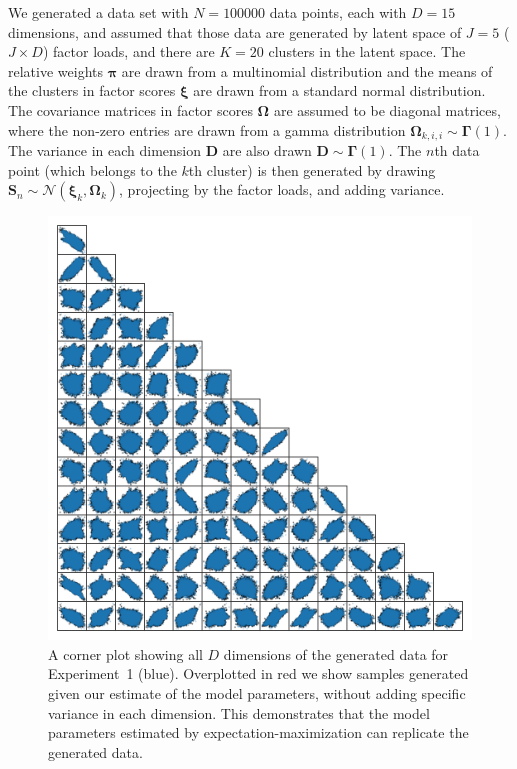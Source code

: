 \documentclass[twocolumn]{aastex61}
\newcommand{\vect}[1]{\boldsymbol{\mathbf{#1}}}
\renewcommand{\vec}[1]{\vect{#1}}
\newcommand{\weight}{\pi}
\newcommand{\factorscores}{\textbf{S}}
\newcommand{\specificvariance}{\vec{D}}
\newcommand{\scoremeans}{\vec\xi}
\newcommand{\scorecovs}{\vec\Omega}
\newcommand{\NumData}{N}
\newcommand{\NumDimensions}{D}
\newcommand{\numdata}{n}
\newcommand{\NumLatentFactors}{J}
\newcommand{\NumComponents}{K}
\newcommand{\numcomponents}{k}
\begin{document}
We generated a data set with ${\NumData = 100000}$ data points, each with
$\NumDimensions = 15$ dimensions, and assumed that those data are generated by
latent space of $\NumLatentFactors = 5$ ($\NumLatentFactors \times \NumDimensions$) factor loads, and there are $\NumComponents = 20$
clusters in the latent space. The relative weights $\vec\weight$
are drawn from a multinomial distribution and the means of the clusters
in factor scores $\scoremeans$ are drawn from a standard normal
distribution. The covariance matrices in factor scores $\scorecovs$ are assumed to be diagonal matrices, where the non-zero entries are drawn from a gamma distribution $\scorecovs_{\numcomponents,i,i} \sim \vec\Gamma\left(1\right)$. The variance in 
each dimension $\specificvariance$ are also drawn $\specificvariance \sim \vec\Gamma\left(1\right)$.
The $\numdata$th data point (which belongs to the $\numcomponents$th cluster) is then
generated by drawing $\factorscores_{\numdata} \sim \mathcal{N}(\scoremeans_\numcomponents,\scorecovs_\numcomponents)$, projecting by the factor loads, and adding variance.



\begin{figure}
	\includegraphics[width=1.0\textwidth]{experiments/exp1-data.png}
    \caption{A corner plot showing all $\NumDimensions$ dimensions of the
    		 generated data for Experiment~1 (blue). Overplotted in red
		 	 we show samples generated given our estimate of the model 
			 parameters, without adding specific variance in each dimension.
			 This demonstrates that the model parameters estimated by
			 expectation-maximization can replicate the generated data.}
    \label{fig:exp1-data}
\end{figure}
\end{document}
